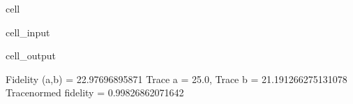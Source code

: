 \documentclass[letterpaper,table,10pt,english]{jupyterBook}
\begin{document}
\begin{sphinxuseclass}{cell}\begin{sphinxVerbatimInput}

\begin{sphinxuseclass}{cell_input}
\begin{sphinxVerbatim}[commandchars=\\\{\}]
\end{sphinxVerbatim}

\end{sphinxuseclass}\end{sphinxVerbatimInput}
\begin{sphinxVerbatimOutput}

\begin{sphinxuseclass}{cell_output}
\begin{sphinxVerbatim}[commandchars=\\\{\}]
Fidelity (a,b) = 22.97696895871
Trace a = 25.0, Trace b = 21.191266275131078
Trace\PYGZhy{}normed fidelity = 0.99826862071642
\end{sphinxVerbatim}

\end{sphinxuseclass}\end{sphinxVerbatimOutput}

\end{sphinxuseclass}
\end{document}
